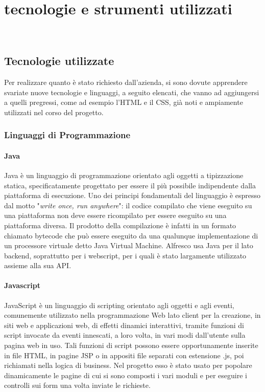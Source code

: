 
\chapter{tecnologie e strumenti utilizzati}
\label{cap:tecnologie-strumenti}

\\

\section{Tecnologie utilizzate}
Per realizzare quanto è stato richiesto dall'azienda, si sono dovute apprendere svariate nuove tecnologie e linguaggi, a seguito elencati, che vanno ad aggiungersi a quelli pregressi, come ad esempio l'HTML e il CSS, già noti e ampiamente utilizzati nel corso del progetto.
\subsection{Linguaggi di Programmazione}
\subsubsection{Java}
Java è un linguaggio di programmazione orientato agli oggetti a tipizzazione statica,
specificatamente progettato per essere il più possibile indipendente dalla piattaforma
di esecuzione. Uno dei principi fondamentali del linguaggio è espresso dal motto "\textit{write
once, run anywhere}": il codice compilato che viene eseguito su una piattaforma non
deve essere ricompilato per essere eseguito su una piattaforma diversa. Il prodotto
della compilazione è infatti in un formato chiamato bytecode che può essere eseguito da
una qualunque implementazione di un processore virtuale detto Java Virtual Machine.
Alfresco usa Java per il lato backend, soprattutto per i webscript, per i quali è stato largamente utilizzato assieme alla sua API.
\subsubsection{Javascript}
JavaScript è un linguaggio di scripting orientato agli oggetti e agli eventi, comunemente
utilizzato nella programmazione Web lato client per la creazione, in siti web e
applicazioni web, di effetti dinamici interattivi, tramite funzioni di script invocate da
eventi innescati, a loro volta, in vari modi dall’utente sulla pagina web in uso. Tali
funzioni di script possono essere opportunamente inserite in file HTML, in pagine JSP
o in appositi file separati con estensione .js, poi richiamati nella logica di business.
Nel progetto esso è stato usato per popolare dinamicamente le pagine di cui si sono composti i vari moduli e per eseguire i controlli sui form una volta inviate le richieste.
